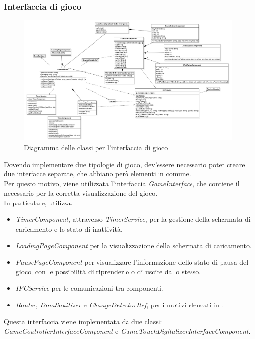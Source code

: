 \subsubsection{Interfaccia di gioco}
\begin{figure}[h]
    \centering
    \includegraphics[width=340pt]{images/prog/GameInterface.png}
    \caption{Diagramma delle classi per l'interfaccia di gioco}
    \label{fig:gameinterface}
\end{figure}
Dovendo implementare due tipologie di gioco, dev'essere necessario poter creare due interfacce separate, che abbiano però elementi in comune.\\
Per questo motivo, viene utilizzata l'interfaccia \emph{GameInterface}, che contiene il necessario per la corretta visualizzazione del gioco.\\
In particolare, utilizza:
\begin{itemize}
    \item \emph{TimerComponent}, attraverso \emph{TimerService}, per la gestione della schermata di caricamento e lo stato di inattività.
    \item \emph{LoadingPageComponent} per la visualizzazione della schermata di caricamento.
    \item \emph{PausePageComponent} per visualizzare l'informazione dello stato di pausa del gioco, con le possibilità di riprenderlo o di uscire dallo stesso.
    \item \emph{IPCService} per le comunicazioni tra componenti.
    \item \emph{Router}, \emph{DomSanitizer} e \emph{ChangeDetectorRef}, per i motivi elencati in .
\end{itemize}
Questa interfaccia viene implementata da due classi: \emph{GameControllerInterfaceComponent} e \emph{GameTouchDigitalizerInterfaceComponent}.
\newpage
